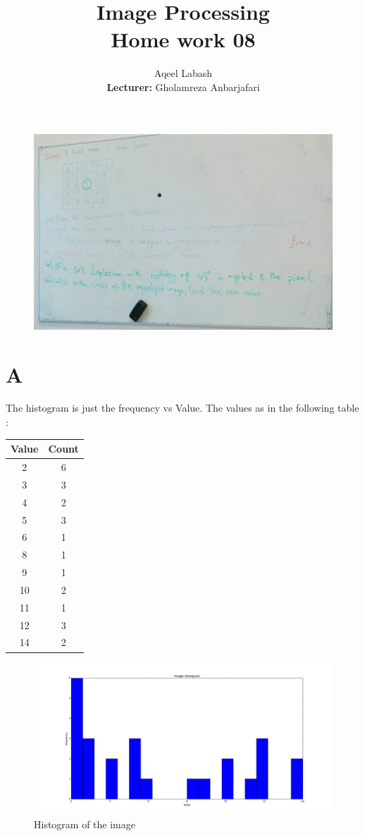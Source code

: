\documentclass{article}
\title{Image Processing\\
	Home work 08}
\author{Aqeel Labash\\ \textbf{Lecturer:} Gholamreza Anbarjafari}
\begin{document}
	\maketitle
\begin{figure}[H]
\includegraphics[scale=0.415]{Questions.jpg}
\end{figure}
\section*{A}
The histogram is just the frequency vs Value. The values as in the following table : \\
\begin{tabular}{|c|c|}
\hline
Value &Count\\ \hline
2&6\\ \hline 
3&3\\ \hline 
4&2\\ \hline 
5&3\\ \hline 
6&1\\ \hline 
8&1\\ \hline 
9&1\\ \hline 
10&2\\ \hline 
11&1\\ \hline  
12&3\\ \hline 
14&2 \\ \hline
\end{tabular}
 
 \begin{figure}[H]
 \includegraphics[trim={5cm 0cm 5cm 0cm},clip,scale=0.35]{histogram_py.png}
 \caption{Histogram of the image}
 \end{figure}
\end{document}
